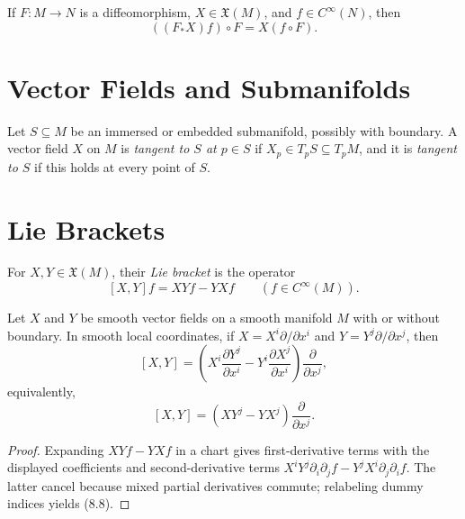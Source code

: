 \begin{corollary}
\label{cor:8-21}





If $F\colon M\to N$ is a diffeomorphism, $X\in\mathfrak{X}(M)$, and
$f\in C^\infty(N)$, then
\[
((F_*X)f)\circ F=X(f\circ F).
\]
\end{corollary}

\section{Vector Fields and Submanifolds}

\begin{definition}
\label{def:8-58-extra-1}




Let $S\subseteq M$ be an immersed or embedded submanifold, possibly with
boundary. A vector field $X$ on $M$ is \emph{tangent to $S$ at $p\in S$} if
$X_p\in T_pS\subseteq T_pM$, and it is \emph{tangent to $S$} if this holds at
every point of $S$.
\end{definition}

\section{Lie Brackets}

\begin{definition}
\label{def:8-59-extra-1}



For $X,Y\in\mathfrak{X}(M)$, their \emph{Lie bracket} is the operator
\[
[X,Y]f=XYf-YXf
\qquad (f\in C^\infty(M)).
\]
\end{definition}

\begin{proposition}
\label{prop:8-26}




Let $X$ and $Y$ be smooth vector fields on a smooth manifold $M$ with or
without boundary. In smooth local coordinates, if
$X=X^i\partial/\partial x^i$ and $Y=Y^j\partial/\partial x^j$, then
\[
[X,Y]=\left(X^i\frac{\partial Y^j}{\partial x^i}
-Y^i\frac{\partial X^j}{\partial x^i}\right)
\frac{\partial}{\partial x^j}, \tag{8.8}
\]
equivalently,
\[
[X,Y]=(XY^j-YX^j)\frac{\partial}{\partial x^j}. \tag{8.9}
\]
\end{proposition}

\begin{proof}

\sketch Expanding $XYf-YXf$ in a chart gives first-derivative terms with the
displayed coefficients and second-derivative terms
$X^iY^j\partial_i\partial_jf-Y^jX^i\partial_j\partial_if$. The latter cancel
because mixed partial derivatives commute; relabeling dummy indices yields
(8.8).
\end{proof}

